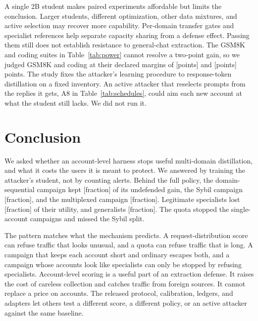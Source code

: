 \documentclass[journal]{IEEEtran}
\newcommand{\tbd}[1]{\textcolor{red!65!black}{[#1]}}
\begin{document}
A single 2B student makes paired experiments affordable but limits the conclusion. Larger students, different optimization, other data mixtures, and active selection may recover more capability. Per-domain transfer gates and specialist references help separate capacity sharing from a defense effect. Passing them still does not establish resistance to general-chat extraction. The GSM8K and coding suites in Table~\ref{tab:power} cannot resolve a two-point gain, so we judged GSM8K and coding at their declared margins of \tbd{points} and \tbd{points} points. The study fixes the attacker's learning procedure to response-token distillation on a fixed inventory. An active attacker that reselects prompts from the replies it gets, A8 in Table~\ref{tab:schedules}, could aim each new account at what the student still lacks. We did not run it.

\section{Conclusion}
We asked whether an account-level harness stops useful multi-domain distillation, and what it costs the users it is meant to protect. We answered by training the attacker's student, not by counting alerts. Behind the full policy, the domain-sequential campaign kept \tbd{fraction} of its undefended gain, the Sybil campaign \tbd{fraction}, and the multiplexed campaign \tbd{fraction}. Legitimate specialists lost \tbd{fraction} of their utility, and generalists \tbd{fraction}. The quota stopped the single-account campaigns and missed the Sybil split.

The pattern matches what the mechanism predicts. A request-distribution score can refuse traffic that looks unusual, and a quota can refuse traffic that is long. A campaign that keeps each account short and ordinary escapes both, and a campaign whose accounts look like specialists can only be stopped by refusing specialists. Account-level scoring is a useful part of an extraction defense. It raises the cost of careless collection and catches traffic from foreign sources. It cannot replace a price on accounts. The released protocol, calibration, ledgers, and adapters let others test a different score, a different policy, or an active attacker against the same baseline.



\end{document}
